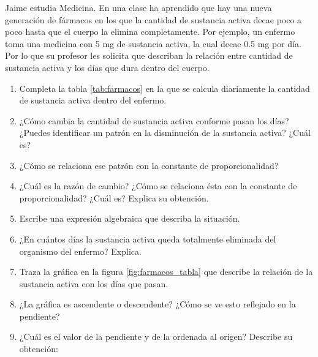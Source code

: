 \documentclass[11pt]{book}
\begin{document}
\begin{enumerate}
        \begin{minipage}[t]{.55\textwidth}
          Jaime estudia Medicina. En una clase ha aprendido que hay una nueva generación de fármacos en los que la cantidad de
          sustancia activa decae poco a poco hasta que el cuerpo la elimina completamente. Por ejemplo, un enfermo toma una
          medicina con 5 mg de sustancia activa, la cual decae 0.5 mg por día. Por lo que su profesor les solicita que describan
          la relación entre cantidad de sustancia activa y los días que dura dentro del cuerpo.
          \begin{enumerate}
            \item Completa la tabla \ref{tab:farmacos} en la que se calcula diariamente la cantidad de sustancia activa dentro del enfermo.\\[0.1cm]
            \item ¿Cómo cambia la cantidad de sustancia activa conforme pasan los días? ¿Puedes identificar un patrón en la disminución de la sustancia activa? ¿Cuál es?
            \item ¿Cómo se relaciona ese patrón con la constante de proporcionalidad?
            \item ¿Cuál es la razón de cambio? ¿Cómo se relaciona ésta con la constante de proporcionalidad? ¿Cuál es? Explica su obtención.
            \item Escribe una expresión algebraica que describa la situación.
            \item ¿En cuántos días la sustancia activa queda totalmente eliminada del organismo del enfermo? Explica.
            \item Traza la gráfica en la figura \ref{fig:farmacos_tabla} que describe la relación de la sustancia activa con los días que pasan.
            \item ¿La gráfica es ascendente o descendente? ¿Cómo se ve esto reflejado en la pendiente?
            \item ¿Cuál es el valor de la pendiente y de la ordenada al origen? Describe su obtención:
          \end{enumerate}
        \end{minipage}\hfill%
        \begin{minipage}[t]{.38\textwidth}
          \begin{figure}[H]
            \centering

\end{figure}
\end{minipage}
\end{enumerate}
\end{document}
